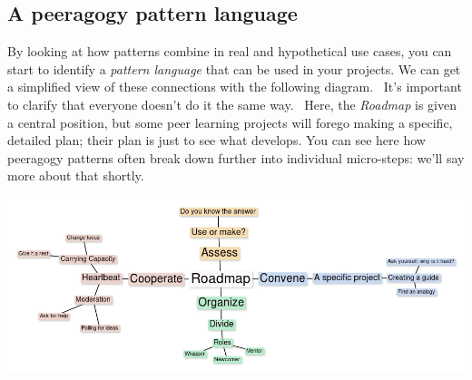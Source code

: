 

\subsection{A peeragogy pattern language}

By looking at how patterns combine in real and hypothetical use cases,
you can start to identify a \emph{pattern language} that can be used in
your projects. We can get a simplified view of these connections with
the following diagram.~ It's important to clarify that everyone doesn't
do it the same way.~ Here, the \emph{Roadmap} is given a central
position, but some peer learning projects will forego making a specific,
detailed plan; their plan is just to see what develops. You can see here
how peeragogy patterns often break down further into individual
micro-steps: we'll say more about that shortly.

{\centering
\includegraphics[width=\textwidth]{../pictures/pattern-language.jpg}\par}

